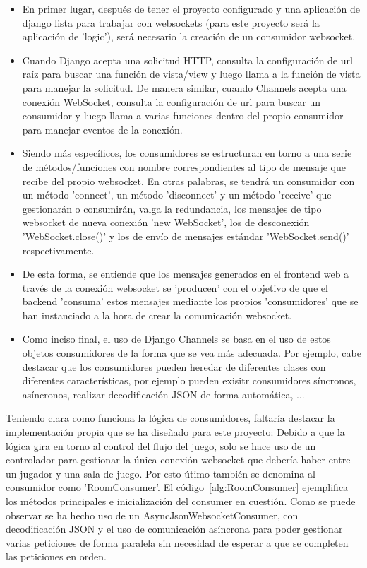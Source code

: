 \begin{itemize}
	\item En primer lugar, después de tener el proyecto configurado y una aplicación de django lista para
	      trabajar con websockets (para este proyecto será la aplicación de 'logic'), será necesario la creación de un 
	      consumidor websocket.
	\item Cuando Django acepta una solicitud HTTP, consulta la configuración de url raíz para buscar una función de vista/view y luego 
	      llama a la función de vista para manejar la solicitud. De manera similar, cuando Channels acepta una conexión WebSocket, 
	      consulta la configuración de url para buscar un consumidor y luego llama a varias funciones dentro del propio consumidor 
	      para manejar eventos de la conexión.
	\item Siendo más específicos, los consumidores se estructuran en torno a una serie de métodos/funciones con nombre correspondientes al tipo de mensaje 
	      que recibe del propio websocket. En otras palabras, se tendrá un consumidor con un método 'connect', un método 'disconnect' y un método 'receive' 
	      que gestionarán o consumirán, valga la redundancia, los mensajes de tipo websocket de nueva conexión 'new WebSocket', los de desconexión 
	      'WebSocket.close()' y los de envío de mensajes estándar 'WebSocket.send()' respectivamente.
	\item De esta forma, se entiende que los mensajes generados en el frontend web a través de la conexión websocket se 'producen' con el objetivo
	      de que el backend 'consuma' estos mensajes mediante los propios 'consumidores' que se han instanciado a la hora de crear la comunicación websocket.
	\item Como inciso final, el uso de Django Channels se basa en el uso de estos objetos consumidores de la forma que se vea 
	      más adecuada. Por ejemplo, cabe destacar que los consumidores pueden heredar de diferentes clases con diferentes características,
	      por ejemplo pueden exisitr consumidores síncronos, asíncronos, realizar decodificación JSON de forma automática, ...
\end{itemize}

Teniendo clara como funciona la lógica de consumidores, faltaría destacar la implementación propia que se ha diseñado para este proyecto: Debido a que 
la lógica gira en torno al control del flujo del juego, solo se hace uso de un controlador para gestionar la única conexión websocket que debería haber entre
un jugador y una sala de juego. Por esto útimo también se denomina al consumidor como 'RoomConsumer'. El código~\ref{alg:RoomConsumer} ejemplifica los métodos 
principales e inicialización del consumer en cuestión. Como se puede observar se ha hecho uso de un AsyncJsonWebsocketConsumer, con decodificación JSON y el uso de 
comunicación asíncrona para poder gestionar varias peticiones de forma paralela sin necesidad de esperar a que se completen las peticiones en orden.

